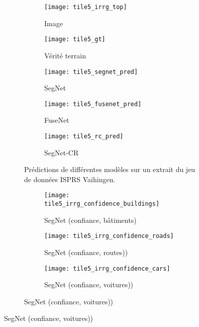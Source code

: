 \begin{figure}[!tb]
	\begin{subfigure}{\textwidth}
    	\captionsetup[subfigure]{singlelinecheck=off,justification=centering}
  		\captionsetup[subfigure]{labelformat=empty}
    	\begin{subfigure}{0.19\textwidth}
        	\texttt{[image: tile5\_irrg\_top]}
      		\caption*{Image }
        \end{subfigure}
        \begin{subfigure}{0.19\textwidth}
        	\texttt{[image: tile5\_gt]}
        	\caption*{Vérité terrain}
        \end{subfigure}
        \begin{subfigure}{0.19\textwidth}
        	\texttt{[image: tile5\_segnet\_pred]}
        	\caption*{SegNet}
        \end{subfigure}
        \begin{subfigure}{0.19\textwidth}
        	\texttt{[image: tile5\_fusenet\_pred]}
        	\caption*{FuseNet}
        \end{subfigure}
        \begin{subfigure}{0.19\textwidth}
        	\texttt{[image: tile5\_rc\_pred]}
        	\caption*{SegNet-CR}
        \end{subfigure}
        \caption{Prédictions de différentes modèles sur un extrait du jeu de données \gls{ISPRS} Vaihingen.}
        \label{fig:fusion_exemple1}
    \end{subfigure}
    	\begin{subfigure}{\textwidth}
    	\captionsetup[subfigure]{singlelinecheck=off,justification=centering}
  		\captionsetup[subfigure]{labelformat=empty}
    	\begin{subfigure}{0.19\textwidth}
        	\texttt{[image: tile5\_irrg\_confidence\_buildings]}
      		\caption*{SegNet  (confiance, bâtiments)}
        \end{subfigure}
        \begin{subfigure}{0.19\textwidth}
        	\texttt{[image: tile5\_irrg\_confidence\_roads]}
        	\caption*{SegNet  (confiance, routes))}
        \end{subfigure}
        \begin{subfigure}{0.19\textwidth}
        	\texttt{[image: tile5\_irrg\_confidence\_cars]}
        	\caption*{SegNet  (confiance, voitures))}

\end{subfigure}
\end{subfigure}
\end{figure}
